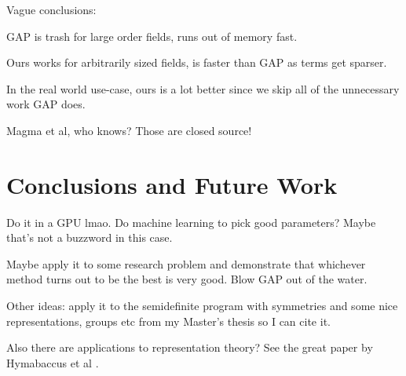 \documentclass{article}
\begin{document}
Vague conclusions:

GAP is trash for large order fields, runs out of memory fast.

Ours works for arbitrarily sized fields, is faster than GAP as
terms get sparser.

In the real world use-case, ours is a lot better since we skip all of
the unnecessary work GAP does.

Magma et al, who knows? Those are closed source!

\section{Conclusions and Future Work}

Do it in a GPU lmao. Do machine learning to pick good parameters?
Maybe that's not a buzzword in this case.

Maybe apply it to some research problem and demonstrate that whichever
method turns out to be the best is very good. Blow GAP out of the
water.

Other ideas: apply it to the semidefinite program with symmetries and
some nice representations, groups etc from my Master's thesis so I can
cite it.

Also there are applications to representation theory? See the great
paper by Hymabaccus et al \cite{Hymabaccus2020}.



\end{document}
